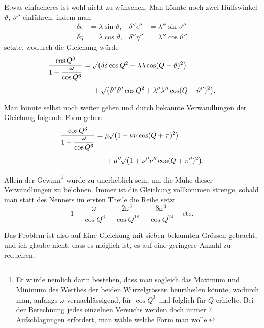 Etwas einfacheres ist wohl nicht zu wünschen. Man könnte noch zwei Hülfswinkel \(\vartheta\), \(\vartheta''\) einführen, indem man
\[
\begin{aligned}
\delta\epsilon&=\lambda\sin\vartheta, &\delta''\epsilon''&=\lambda''\sin\vartheta''\\
\delta\eta&=\lambda\cos\vartheta, &\delta''\eta''&=\lambda''\cos\vartheta''
\end{aligned}
\]
setzte, wodurch die Gleichung würde
\[
\begin{aligned}
\frac{\cos Q^3}{1-\dfrac\omega{\cos Q^6}}={}&\mathord{{}^{}\!\surd}\bigl(\delta\delta\cos Q^2+\lambda\lambda\cos(Q-\vartheta)^2\bigr)\\[4pt]
&+\mathord{{}^{}\!\surd}\bigl(\delta''\delta''\cos Q^2+\lambda''\lambda''\cos(Q-\vartheta'')^2\bigr).
\end{aligned}
\]

Man könnte selbst noch weiter gehen und durch bekannte Verwandlungen der Gleichung folgende Form geben:
\[
\begin{aligned}
\frac{\cos Q^3}{1-\dfrac\omega{\cos Q^6}}={}&\mu\mathord{{}^{}\!\surd}\bigl(1+\nu\nu\cos(Q+\pi)^2\bigr)\\[4pt]
&+\mu''\mathord{{}^{}\!\surd}\bigl(1+\nu''\nu''\cos(Q+\pi'')^2\bigr).
\end{aligned}
\]

Allein der Gewinn\footnote{Er würde nemlich  darin bestehen, dass man sogleich das Maximum und Minimum des Werthes der beiden Wurzelgrössen beurtheilen könnte, wodurch man, anfangs \(\omega\) vernachlässigend,  für \(\cos Q^3\) und folglich für \(Q\) erhielte. Bei der Berechnung jedes einzelnen Versuchs werden doch immer 7 Aufschlagungen erfordert, man wähle welche Form man wolle.} würde zu unerheblich sein, um die Mühe dieser Verwandlungen zu belohnen. Immer ist die Gleichung vollkommen strenge, sobald man statt des Nenners im ersten Theile die Reihe setzt
\[
1-\frac\omega{\cos Q^6}-\frac{2\omega^3}{\cos Q^{18}}-\frac{8\omega^4}{\cos Q^{24}}-\text{etc.}
\]

Das Problem ist also auf Eine Gleichung mit sieben bekannten Grössen gebracht, und ich glaube nicht, dass es möglich ist, es auf eine geringere Anzahl zu reduciren.

